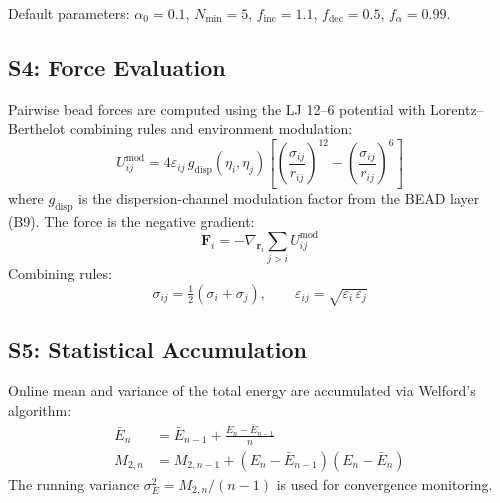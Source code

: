 \documentclass[11pt, a4paper, oneside]{article}
\begin{document}
\noindent Default parameters: $\alpha_0 = 0.1$, $N_{\min} = 5$,
$f_{\text{inc}} = 1.1$, $f_{\text{dec}} = 0.5$, $f_\alpha = 0.99$.

\newpage
\subsection{S4: Force Evaluation}
\label{sec:s4-forces}

Pairwise bead forces are computed using the LJ 12--6 potential with
Lorentz--Berthelot combining rules and environment modulation:
%
\begin{equation}
  U_{ij}^{\text{mod}} = 4\varepsilon_{ij}\,g_{\text{disp}}(\eta_i, \eta_j)
  \left[
    \left(\frac{\sigma_{ij}}{r_{ij}}\right)^{12}
    - \left(\frac{\sigma_{ij}}{r_{ij}}\right)^{6}
  \right]
  \label{eq:lj-modulated}
\end{equation}
%
where $g_{\text{disp}}$ is the dispersion-channel modulation factor
from the BEAD layer (B9).  The force is the negative gradient:
%
\begin{equation}
  \mathbf{F}_i = -\nabla_{\mathbf{r}_i} \sum_{j > i} U_{ij}^{\text{mod}}
\end{equation}
%
Combining rules:
%
\begin{equation}
  \sigma_{ij} = \tfrac{1}{2}(\sigma_i + \sigma_j), \qquad
  \varepsilon_{ij} = \sqrt{\varepsilon_i\,\varepsilon_j}
\end{equation}

\subsection{S5: Statistical Accumulation}
\label{sec:s5-stats}

Online mean and variance of the total energy are accumulated via
Welford's algorithm:
%
\begin{align}
  \bar{E}_n &= \bar{E}_{n-1} + \frac{E_n - \bar{E}_{n-1}}{n}
  \label{eq:welford-mean} \\[4pt]
  M_{2,n} &= M_{2,n-1} + (E_n - \bar{E}_{n-1})(E_n - \bar{E}_n)
  \label{eq:welford-m2}
\end{align}
%
The running variance $\sigma_E^2 = M_{2,n} / (n-1)$ is used for
convergence monitoring.
\end{document}
